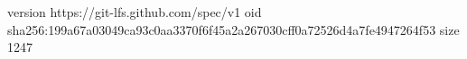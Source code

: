 version https://git-lfs.github.com/spec/v1
oid sha256:199a67a03049ca93c0aa3370f6f45a2a267030cff0a72526d4a7fe4947264f53
size 1247
